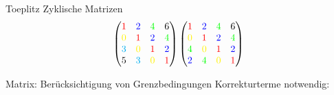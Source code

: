 \documentclass[11pt]{beamer}
\begin{document}
\begin{frame}{Toeplitz Zyklische Matrizen}
\[
\begin{pmatrix}
{\color{red} 1} & {\color{blue} 2} & {\color{green} 4} & 6\\
{\color{yellow} 0}  & {\color{red} 1} & {\color{blue} 2} & {\color{green} 4} \\
{\color{cyan} 3} & {\color{yellow} 0} & {\color{red} 1} & {\color{blue} 2}\\
5 & {\color{cyan} 3} & {\color{yellow} 0} & {\color{red} 1}\\
\end{pmatrix}

\begin{pmatrix}
{\color{red}    1} & {\color{blue}   2} & {\color{green}  4} & 6\\
{\color{yellow} 0} & {\color{red}    1} & {\color{blue}   2} & {\color{green} 4} \\
{\color{green}  4} & {\color{yellow} 0} & {\color{red}    1} & {\color{blue} 2}\\
{\color{blue}   2} & {\color{green}  4} & {\color{yellow} 0} & {\color{red} 1}\\
\end{pmatrix}
\]
\end{frame}


\begin{frame}{Matrix: Berücksichtigung von Grenzbedingungen}
Korrekturterme notwendig: 
\end{frame}
\end{document}
